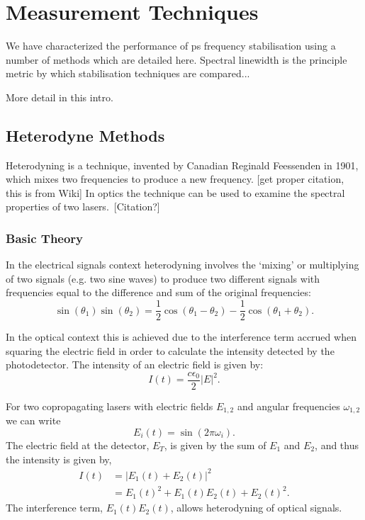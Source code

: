 \chapter{Measurement Techniques}
We have characterized the performance of \gls*{ps} frequency stabilisation using a number of methods which are detailed here. Spectral linewidth is the principle metric by which stabilisation techniques are compared...

{\color{red}More detail in this intro.}

\section{Heterodyne Methods}

Heterodyning is a technique, invented by Canadian Reginald Feessenden in 1901, which mixes two frequencies to produce a new frequency. {\color{red} [get proper citation, this is from Wiki]} In optics the technique can be used to examine the spectral properties of two lasers.~{\color{red}[Citation?]}

\subsection{Basic Theory}
In the electrical signals context heterodyning involves the `mixing' or multiplying of two signals (e.g. two sine waves) to produce two different signals with frequencies equal to the difference and sum of the original frequencies:
\begin{equation}
\sin(\theta_1)\sin(\theta_2) = \frac{1}{2} \cos(\theta_1-\theta_2) - \frac{1}{2} \cos(\theta_1+\theta_2).
\end{equation}

In the optical context this is achieved due to the interference term accrued when squaring the electric field in order to calculate the intensity detected by the photodetector. The intensity of an electric field is given by:
\begin{equation}
I(t) = \frac{c\epsilon_0}{2}|E|^2.
\end{equation}

For two copropagating lasers with electric fields $E_{1, 2}$ and angular frequencies $\omega_{1, 2}$ we can write
\begin{equation}
E_{i}(t) = \sin(2\pi \omega_{i}).
\end{equation}
The electric field at the detector, $E_T$, is given by the sum of $E_{1}$ and $E_{2}$, and thus the intensity is given by,
\begin{align}
I(t) &= |E_1(t) + E_2(t)|^2\nonumber\\
&= E_1(t)^2 + E_1(t)E_2(t) + E_2(t)^2.
\end{align}
The interference term, $E_1(t)E_2(t)$, allows heterodyning of optical signals.

